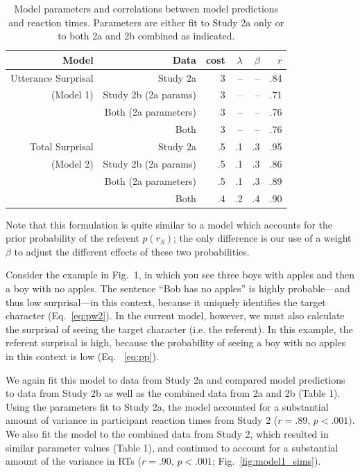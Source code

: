 \documentclass[10pt,letterpaper]{article}
\begin{document}
\begin{table}[t]
\caption{\label{tab:modelcorrs} Model parameters and correlations between model predictions and reaction times.  Parameters are either fit to Study 2a only or to both 2a and 2b combined as indicated.}
\begin{center}
\small\addtolength{\tabcolsep}{-2pt}
\begin{tabular}{ r r  r  r  r  r} 
\hline
  \bf{Model} & \bf{Data} & \bf{cost} & \bf{$\lambda$} & \bf{$\beta$} & \bf{$r$}  \\ \hline        
 Utterance Surprisal  &  Study 2a  & 3 & -- & -- & .84\\     
  (Model 1)& Study 2b (2a params) & 3  & -- & -- & .71\\
  & Both (2a parameters) &  3 & -- & -- & .76 \\
  & Both & 3 &  --  &  -- & .76 \\ \hline
Total Surprisal & Study 2a & .5 & .1 & .3 & .95\\     
  (Model 2) & Study 2b (2a params) & .5  & .1 & .3 & .86\\
  & Both (2a parameters) &  .5 & .1 & .3 & .89\\
  & Both & .4 &   .2 &  .4 & .90\\ 
\hline
\end{tabular}
\end{center}
\end{table}

\noindent Note that this formulation is quite similar to a model which accounts for the prior probability of the referent $p(r_S)$; the only difference is our use of a weight $\beta$ to adjust the different effects of these two probabilities.  

Consider the example in Fig.\ 1, in which you see three boys with apples and then a boy with no apples.  The sentence ``Bob has no apples'' is highly probable---and thus low surprisal---in this context, because it uniquely identifies the target character (Eq.\ \ref{eq:pw2}).  In the current model, however, we must also calculate the surprisal of seeing the target character (i.e. the referent).  In this example, the referent surprisal is high, because the probability of seeing a boy with no apples in this context is low (Eq. \ \ref{eq:pp}).  

We again fit this model to data from Study 2a and compared model predictions to data from Study 2b as well as the combined data from 2a and 2b (Table 1).  Using the parameters fit to Study 2a, the model accounted for a substantial amount of variance in participant reaction times from Study 2 ($r=.89$, $p<.001)$.  We also fit the model to the combined data from Study 2, which resulted in similar parameter values (Table 1), and continued to account for a substantial amount of the variance in RTs ($r=.90$, $p<.001$; Fig.\ \ref{fig:model1_sims}).   
\end{document}
